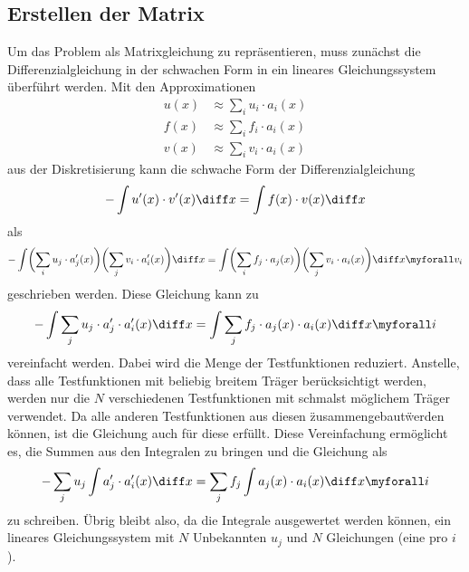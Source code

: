 \subsection{Erstellen der Matrix\label{fem:1d:matrix_erstellen}}
Um das Problem als Matrixgleichung zu repräsentieren, muss zunächst die Differenzialgleichung in der schwachen Form in ein lineares Gleichungssystem überführt werden.
Mit den Approximationen 
\begin{align}
    u(x) &\approx \sum_i u_i \cdot a_i(x) \\
    f(x) &\approx \sum_i f_i \cdot a_i(x) \\
    v(x) &\approx \sum_i v_i \cdot a_i(x)
\end{align}
aus der Diskretisierung kann die schwache Form der Differenzialgleichung 
\begin{equation}
    - \int u'(x) \cdot v'(x) \diff x = \int f(x) \cdot v(x) \diff x
\end{equation}
als
\begin{equation}
    - \int \biggl(\sum_i u_j \cdot a'_j(x)\biggr) \biggl(\sum_j v_i \cdot a'_i(x)\biggr) \diff x 
    = \int \biggl(\sum_i f_j \cdot a_j(x) \biggr) \biggl(\sum_j v_i \cdot a_i(x) \biggr) \diff x 
    \myforall v_i
\end{equation}
geschrieben werden.
Diese Gleichung kann zu
\begin{equation}
    - \int \sum_j u_j \cdot a'_j \cdot a'_i(x) \diff x = \int \sum_j f_j \cdot a_j(x) \cdot a_i(x) \diff x \myforall i
\end{equation}
vereinfacht werden.
Dabei wird die Menge der Testfunktionen reduziert.
Anstelle, dass alle Testfunktionen mit beliebig breitem Träger berücksichtigt werden, werden nur die $N$ verschiedenen Testfunktionen mit schmalst möglichem Träger verwendet.
Da alle anderen Testfunktionen aus diesen \"zusammengebaut\" werden können, ist die Gleichung auch für diese erfüllt.
Diese Vereinfachung ermöglicht es, die Summen aus den Integralen zu bringen und die Gleichung als
\begin{equation}
    - \sum_j u_j \int a'_j \cdot a'_i(x) \diff x = \sum_j f_j \int a_j(x) \cdot a_i(x) \diff x \myforall i \label{papers:fem:prinzip1d:finale_gleichung}
\end{equation}
zu schreiben.
Übrig bleibt also, da die Integrale ausgewertet werden können, ein lineares Gleichungssystem mit $N$ Unbekannten $u_j$ und $N$ Gleichungen (eine pro $i$). 

